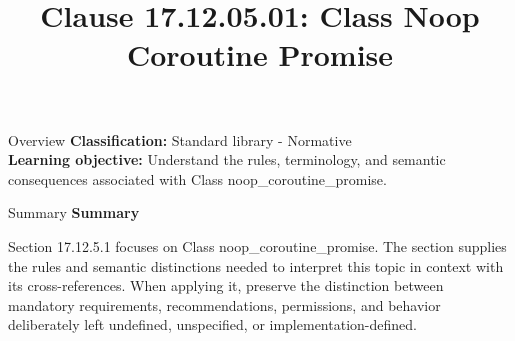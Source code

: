 \documentclass[10pt,letterpaper]{article}
\title{Clause 17.12.05.01: Class Noop Coroutine Promise}
\author{}
\date{}
\begin{document}
\maketitle
\begin{CornellOverviewBox}{Overview}
\textbf{Classification:} Standard library - Normative\\[2pt]
\textbf{Learning objective:} Understand the rules, terminology, and semantic consequences associated with Class noop\_coroutine\_promise.
\end{CornellOverviewBox}\begin{CornellSummaryBox}{Summary}
{\sffamily\bfseries\color{Accent} Summary}\par\vspace{3pt}Section 17.12.5.1 focuses on Class noop\_coroutine\_promise. The section supplies the rules and semantic distinctions needed to interpret this topic in context with its cross-references. When applying it, preserve the distinction between mandatory requirements, recommendations, permissions, and behavior deliberately left undefined, unspecified, or implementation-defined.
\end{CornellSummaryBox}
\end{document}
